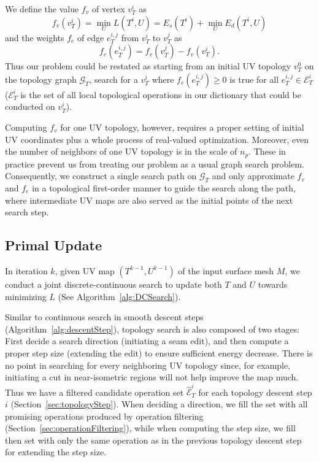 We define the value $f_v$ of vertex $v^i_T$ as 
\[ f_v(v^i_T) = \min_{U} L(T^i, U) = E_s(T^i) + \min_{U} E_d(T^i, U) \]
and the weights $f_e$ of edge $e^{i,j}_{T}$ from $v^i_T$ to $v^j_T$ as 
\[ f_e(e^{i,j}_T) = f_v(v^j_T) - f_v(v^i_T). \]
Thus our problem could be restated as starting from an initial UV topology $v^0_T$ on the topology graph $\mathcal{G}_T$, search for a $v^i_T$ where $f_e(e^{i,j}_T) \geq 0$ is true for all $e^{i,j}_T \in \mathcal{E}^i_T$ ($\mathcal{E}^i_T$ is the set of all local topological operations in our dictionary that could be conducted on $v^i_T$).

Computing $f_v$ for one UV topology, however, requires a proper setting of initial UV coordinates plus a whole process of real-valued optimization. Moreover, even the number of neighbors of one UV topology is in the scale of $n_p$. These in practice prevent us from treating our problem as a usual graph search problem. Consequently, we construct a single search path on $\mathcal{G}_T$ and only approximate $f_v$ and $f_e$ in a topological first-order manner to guide the search along the path, where intermediate UV maps are also served as the initial points of the next search step.

\subsection{Primal Update}

In iteration $k$, given UV map $(T^{k-1}, U^{k-1})$ of the input surface mesh $M$, we conduct a joint discrete-continuous search to update both $T$ and $U$ towards minimizing $L$ (See Algorithm~\ref{alg:DCSearch}).

Similar to continuous search in smooth descent steps (Algorithm~\ref{alg:descentStep}), topology search is also composed of two stages: First decide a search direction (initiating a seam edit), and then compute a proper step size (extending the edit) to ensure sufficient energy decrease. There is no point in searching for every neighboring UV topology since, for example, initiating a cut in near-isometric regions will not help improve the map much. Thus we have a filtered candidate operation set $\hat{\mathcal{E}}^i_T$ for each topology descent step $i$ (Section~\ref{sec:topologyStep}). When deciding a direction, we fill the set with all promising operations produced by operation filtering (Section~\ref{sec:operationFiltering}), while when computing the step size, we fill then set with only the same operation as in the previous topology descent step for extending the step size.

